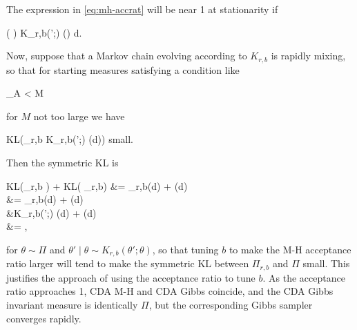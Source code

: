 \documentclass[a4paper,11pt]{article}%
\theoremstyle{example} \theoremstyle{remark} \theoremstyle{lemma}
\theoremstyle{definition} \theoremstyle{corol}
\theoremstyle{proposition} \theoremstyle{condition}
\theoremstyle{assumption}
\newcommand{\bb}[1]{\mathbb{#1}}
\newcommand{\1}{\\[1ex]}
\newcommand{\2}{\\[2ex]}
\newcommand{\3}{\\[3ex]}
\newcommand{\4}{\\[4ex]}
\newcommand{\KL}[2]{\textnormal{KL}\left(#1 \parallel #2\right)}
\def \be{\begin{equs}}
\def \ee{\end{equs}}
\begin{document}
The expression in \eqref{eq:mh-accrat} will be near 1 at stationarity if 
\be 
\int \log \left(  \right) K_{r,b}(\theta';\theta) \Pi(\theta) d\theta {}.
\ee
Now, suppose that a Markov chain evolving according to $K_{r,b}$ is rapidly mixing, so that for starting measures satisfying a condition like
\be
\sup_A  < M
\ee 
for $M$ not too large we have 
\be
\KL{\Pi_{r,b}}{\int K_{r,b}(\theta';\theta) \nu(d\theta)} \quad \textnormal{small}.
\ee
Then the symmetric KL is 
\be
\KL{\Pi_{r,b}}{\Pi} + \KL{\Pi}{\Pi_{r,b}} &= \int \Pi_{r,b}(d\theta) \log {} + \int \Pi(d\theta) \log {} \\
&= \int \Pi_{r,b}(d\theta) \log {} + \int \Pi(d\theta) \log {} \\
&\approx \int K_{r,b}(\theta';\theta) \Pi(d\theta) \log {} + \int \Pi(d\theta) \log {} \\
&= \bb E ,
\ee
for $\theta \sim \Pi$ and $\theta' \mid \theta \sim K_{r,b}(\theta';\theta)$, so that tuning $b$ to make the M-H acceptance ratio larger will tend to make the symmetric KL between $\Pi_{r,b}$ and $\Pi$ small. This justifies the approach of using the acceptance ratio to tune $b$. As the acceptance ratio approaches 1, CDA M-H and CDA Gibbs coincide, and the CDA Gibbs invariant measure is identically $\Pi$, but the corresponding Gibbs sampler converges rapidly. 

\end{document}
